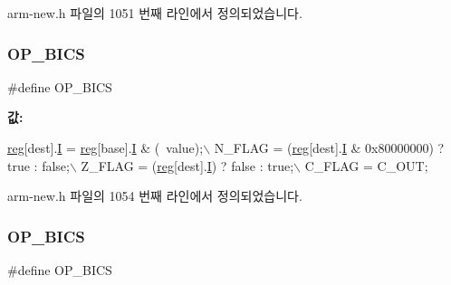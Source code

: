 arm-\/new.\+h 파일의 1051 번째 라인에서 정의되었습니다.

\mbox{\label{arm-new_8h_a45564882500158608a5537bae07be76a}} 
\subsubsection{\texorpdfstring{O\+P\+\_\+\+B\+I\+CS}{OP\_BICS}\hspace{0.1cm}{\footnotesize\ttfamily [1/2]}}
{\footnotesize\ttfamily \#define O\+P\+\_\+\+B\+I\+CS}

{\bfseries 값\+:}
\begin{DoxyCode}
\mbox{\hyperlink{_g_b_a_8h_ae29faba89509024ffd1a292badcedf2d}{reg}}[dest].\mbox{\hyperlink{unionreg__pair_a9f6a42d56c07829d7013571eda998252}{I}} = \mbox{\hyperlink{_g_b_a_8h_ae29faba89509024ffd1a292badcedf2d}{reg}}[base].\mbox{\hyperlink{unionreg__pair_a9f6a42d56c07829d7013571eda998252}{I}} & (~value);\(\backslash\)
    N\_FLAG = (\mbox{\hyperlink{_g_b_a_8h_ae29faba89509024ffd1a292badcedf2d}{reg}}[dest].\mbox{\hyperlink{unionreg__pair_a9f6a42d56c07829d7013571eda998252}{I}} & 0x80000000) ? \textcolor{keyword}{true} : \textcolor{keyword}{false};\(\backslash\)
    Z\_FLAG = (\mbox{\hyperlink{_g_b_a_8h_ae29faba89509024ffd1a292badcedf2d}{reg}}[dest].\mbox{\hyperlink{unionreg__pair_a9f6a42d56c07829d7013571eda998252}{I}}) ? \textcolor{keyword}{false} : \textcolor{keyword}{true};\(\backslash\)
    C\_FLAG = C\_OUT;
\end{DoxyCode}


arm-\/new.\+h 파일의 1054 번째 라인에서 정의되었습니다.

\mbox{\label{_g_b_a_8cpp_a45564882500158608a5537bae07be76a}} 
\subsubsection{\texorpdfstring{O\+P\+\_\+\+B\+I\+CS}{OP\_BICS}\hspace{0.1cm}{\footnotesize\ttfamily [2/2]}}
{\footnotesize\ttfamily \#define O\+P\+\_\+\+B\+I\+CS}

